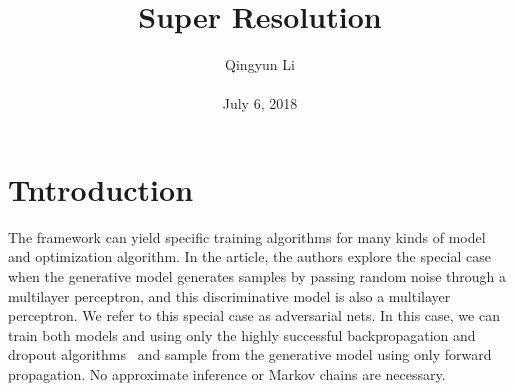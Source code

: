 \documentclass[10pt,twocolumn,letterpaper]{article}
\begin{document}
\author{Qingyun Li\\\\
July 6, 2018}        
\title{Super Resolution}

\maketitle

\section{Tntroduction}
\par The  framework can yield specific training algorithms for many kinds of model and optimization algorithm. In the article, the authors explore the special case when the generative model generates samples by passing random noise through a multilayer perceptron, and this discriminative model is also a multilayer perceptron. We refer to this special case as adversarial nets. In this case, we can train both models and using only the highly successful backpropagation and dropout algorithms~\cite{Hinton2012Improving} and sample from the generative model using only forward propagation. No approximate inference or Markov chains are necessary.
\end{document}
